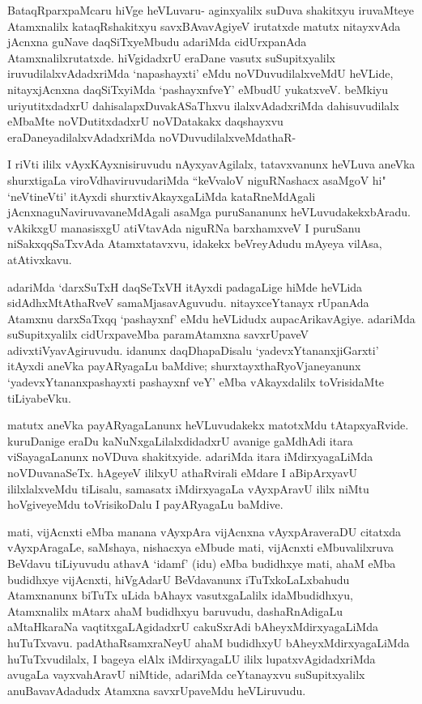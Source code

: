 \begin{artha}
BataqRparxpaMcaru hiVge heVLuvaru- aginxyalilx suDuva shakitxyu iruvaMteye Atamxnalilx kataqRshakitxyu savxBAvavAgiyeV irutatxde matutx nitayxvAda jAcnxna guNave daqSiTxyeMbudu adariMda cidUrxpanAda Atamxnalilxrutatxde. hiVgidadxrU eraDane vasutx suSupitxyalilx iruvudilalxvAdadxriMda `napashayxti' eMdu noVDuvudilalxveMdU heVLide, nitayxjAcnxna daqSiTxyiMda `pashayxnfveY' eMbudU yukatxveV. beMkiyu uriyutitxdadxrU dahisalapxDuvakASaThxvu ilalxvAdadxriMda dahisuvudilalx eMbaMte noVDutitxdadxrU noVDatakakx daqshayxvu eraDaneyadilalxvAdadxriMda noVDuvudilalxveMdathaR-
\end{artha}


\begin{artha}
I riVti ililx vAyxKAyxnisiruvudu nAyxyavAgilalx, tatavxvanunx heVLuva aneVka shurxtigaLa viroVdhaviruvudariMda ``keVvaloV niguRNashacx asaMgoV hi" `neVtineVti' itAyxdi shurxtivAkayxgaLiMda kataRneMdAgali jAcnxnaguNaviruvavaneMdAgali asaMga puruSananunx heVLuvudakekxbAradu. vAkikxgU manasisxgU atiVtavAda niguRNa barxhamxveV I puruSanu niSakxqqSaTxvAda Atamxtatavxvu, idakekx beVreyAdudu mAyeya vilAsa, atAtivxkavu. 
\end{artha}

\begin{artha}
adariMda `darxSuTxH daqSeTxVH itAyxdi padagaLige hiMde heVLida sidAdhxMtAthaRveV samaMjasavAguvudu. nitayxceYtanayx rUpanAda Atamxnu darxSaTxqq `pashayxnf' eMdu heVLidudx aupacArikavAgiye. adariMda suSupitxyalilx cidUrxpaveMba paramAtamxna savxrUpaveV adivxtiVyavAgiruvudu. idanunx daqDhapaDisalu `yadevxYtananxjiGarxti' itAyxdi aneVka payARyagaLu baMdive; shurxtayxthaRyoVjaneyanunx `yadevxYtananxpashayxti pashayxnf veY' eMba vAkayxdalilx toVrisidaMte tiLiyabeVku. 
\end{artha}

\begin{artha}
matutx aneVka payARyagaLanunx heVLuvudakekx matotxMdu tAtapxyaRvide. kuruDanige eraDu kaNuNxgaLilalxdidadxrU avanige gaMdhAdi itara viSayagaLanunx noVDuva shakitxyide. adariMda itara iMdirxyagaLiMda noVDuvanaSeTx. hAgeyeV ililxyU athaRvirali eMdare I aBipArxyavU ililxlalxveMdu tiLisalu, samasatx iMdirxyagaLa vAyxpAravU ililx niMtu hoVgiveyeMdu toVrisikoDalu I payARyagaLu baMdive. 
\end{artha}

\begin{artha}
mati, vijAcnxti eMba manana vAyxpAra vijAcnxna vAyxpAraveraDU citatxda vAyxpAragaLe, saMshaya, nishacxya eMbude mati, vijAcnxti eMbuvalilxruva BeVdavu tiLiyuvudu athavA `idamf' (idu) eMba budidhxye mati, ahaM eMba budidhxye vijAcnxti, hiVgAdarU BeVdavanunx iTuTxkoLaLxbahudu Atamxnanunx biTuTx uLida bAhayx vasutxgaLalilx idaMbudidhxyu, Atamxnalilx mAtarx ahaM budidhxyu baruvudu, dashaRnAdigaLu aMtaHkaraNa vaqtitxgaLAgidadxrU cakuSxrAdi bAheyxMdirxyagaLiMda huTuTxvavu. padAthaRsamxraNeyU ahaM budidhxyU bAheyxMdirxyagaLiMda huTuTxvudilalx, I bageya elAlx iMdirxyagaLU ililx lupatxvAgidadxriMda avugaLa vayxvahAravU niMtide, adariMda ceYtanayxvu suSupitxyalilx anuBavavAdadudx Atamxna savxrUpaveMdu heVLiruvudu.
\end{artha}%

